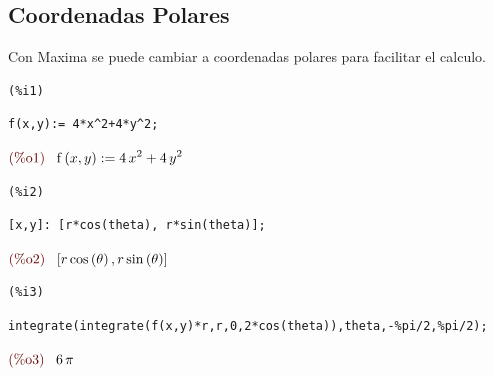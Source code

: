 \documentclass[12pt]{article}
\begin{document}
\subsection{Coordenadas Polares}
Con Maxima se puede cambiar a coordenadas polares para facilitar el calculo.

\noindent
\begin{minipage}[t]{8ex}{\color{red}\bf
\begin{verbatim}
(%i1) 
\end{verbatim}}
\end{minipage}
\begin{minipage}[t]{\textwidth}{\color{blue}
\begin{verbatim}
f(x,y):= 4*x^2+4*y^2;
\end{verbatim}}
\end{minipage}
\begin{math}\displaystyle
\parbox{8ex}{\color{labelcolor}(\%o1) }
\mathrm{f}\left( x,y\right) :=4\,{x}^{2}+4\,{y}^{2}
\end{math}


\noindent
\begin{minipage}[t]{8ex}{\color{red}\bf
\begin{verbatim}
(%i2) 
\end{verbatim}}
\end{minipage}
\begin{minipage}[t]{\textwidth}{\color{blue}
\begin{verbatim}
[x,y]: [r*cos(theta), r*sin(theta)];
\end{verbatim}}
\end{minipage}
\begin{math}\displaystyle
\parbox{8ex}{\color{labelcolor}(\%o2) }
[r\,\mathrm{cos}\left( \theta\right) ,r\,\mathrm{sin}\left( \theta\right) ]
\end{math}


\noindent
\begin{minipage}[t]{8ex}{\color{red}\bf
\begin{verbatim}
(%i3) 
\end{verbatim}}
\end{minipage}
\begin{minipage}[t]{\textwidth}{\color{blue}
\begin{verbatim}
integrate(integrate(f(x,y)*r,r,0,2*cos(theta)),theta,-%pi/2,%pi/2);
\end{verbatim}}
\end{minipage}
\begin{math}\displaystyle
\parbox{8ex}{\color{labelcolor}(\%o3) }
6\,\pi 
\end{math}
\end{document}
